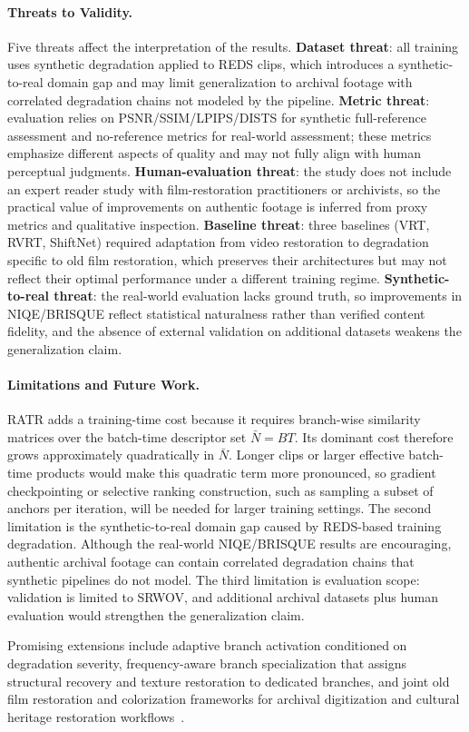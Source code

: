 \paragraph{Threats to Validity.}
Five threats affect the interpretation of the results. \textbf{Dataset threat}: all training uses synthetic degradation applied to REDS clips, which introduces a synthetic-to-real domain gap and may limit generalization to archival footage with correlated degradation chains not modeled by the pipeline. \textbf{Metric threat}: evaluation relies on PSNR/SSIM/LPIPS/DISTS for synthetic full-reference assessment and no-reference metrics for real-world assessment; these metrics emphasize different aspects of quality and may not fully align with human perceptual judgments. \textbf{Human-evaluation threat}: the study does not include an expert reader study with film-restoration practitioners or archivists, so the practical value of improvements on authentic footage is inferred from proxy metrics and qualitative inspection. \textbf{Baseline threat}: three baselines (VRT, RVRT, ShiftNet) required adaptation from video restoration to degradation specific to old film restoration, which preserves their architectures but may not reflect their optimal performance under a different training regime. \textbf{Synthetic-to-real threat}: the real-world evaluation lacks ground truth, so improvements in NIQE/BRISQUE reflect statistical naturalness rather than verified content fidelity, and the absence of external validation on additional datasets weakens the generalization claim.

\paragraph{Limitations and Future Work.}
RATR adds a training-time cost because it requires branch-wise similarity matrices over the batch-time descriptor set $\bar{N}=BT$. Its dominant cost therefore grows approximately quadratically in $\bar{N}$. Longer clips or larger effective batch-time products would make this quadratic term more pronounced, so gradient checkpointing or selective ranking construction, such as sampling a subset of anchors per iteration, will be needed for larger training settings. The second limitation is the synthetic-to-real domain gap caused by REDS-based training degradation. Although the real-world NIQE/BRISQUE results are encouraging, authentic archival footage can contain correlated degradation chains that synthetic pipelines do not model. The third limitation is evaluation scope: validation is limited to SRWOV, and additional archival datasets plus human evaluation would strengthen the generalization claim.

Promising extensions include adaptive branch activation conditioned on degradation severity, frequency-aware branch specialization that assigns structural recovery and texture restoration to dedicated branches, and joint old film restoration and colorization frameworks for archival digitization and cultural heritage restoration workflows~\cite{kokaram2004missing}.
